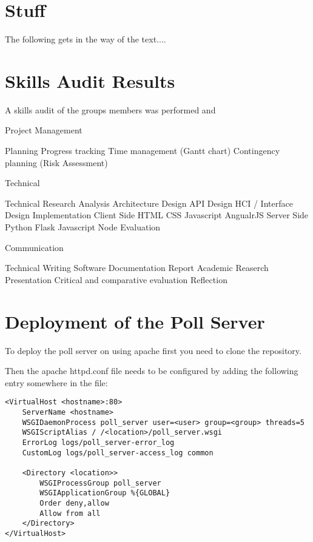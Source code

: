 \chapter{Stuff} \label{Chapter:Stuff}
The following gets in the way of the text....

\chapter{Skills Audit Results} \label{Chapter:Skills Audit Results}

A skills audit of the groups members was performed and 

Project Management

Planning 
Progress tracking 
Time management (Gantt chart) 
Contingency planning (Risk Assessment) 

Technical

Technical Research
Analysis
Architecture Design
API Design
HCI / Interface Design
Implementation
	Client Side
		HTML
		CSS
		Javascript
			AngualrJS
	Server Side
		Python
			Flask
		Javascript
			Node
Evaluation

Communication

Technical Writing
	Software Documentation
	Report
Academic Reaserch
Presentation
Critical and comparative evaluation 
Reflection 

\chapter{Deployment of the Poll Server} \label{Chapter:Deployment Poll Server}

To deploy the poll server on using apache first you need to clone the repository.

Then the apache httpd.conf file needs to be configured by adding the following entry somewhere in the file:

\begin{lstlisting}
<VirtualHost <hostname>:80>
	ServerName <hostname>
	WSGIDaemonProcess poll_server user=<user> group=<group> threads=5
	WSGIScriptAlias / /<location>/poll_server.wsgi
	ErrorLog logs/poll_server-error_log
	CustomLog logs/poll_server-access_log common

	<Directory <location>>
		WSGIProcessGroup poll_server
		WSGIApplicationGroup %{GLOBAL}
		Order deny,allow
		Allow from all
	</Directory>
</VirtualHost>
\end{lstlisting}

